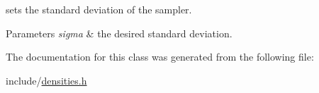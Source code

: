 sets the standard deviation of the sampler. 


\begin{DoxyParams}{Parameters}
{\em sigma} & the desired standard deviation. \\
\hline
\end{DoxyParams}


The documentation for this class was generated from the following file\+:\begin{DoxyCompactItemize}
\item 
include/\hyperlink{densities_8h}{densities.\+h}\end{DoxyCompactItemize}
